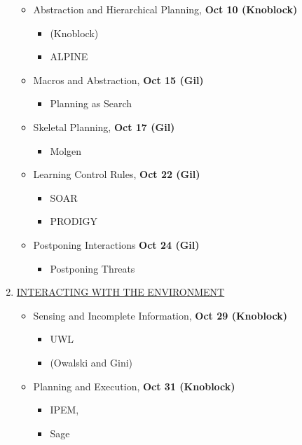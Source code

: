 \begin{enumerate}
\begin{itemize}
  \item Abstraction and Hierarchical Planning, {\bf Oct 10 (Knoblock)}
     \begin{itemize}
     \item (Knoblock) \cite{knoblock91:search} 
     \item ALPINE \cite{knoblock94:aij}
     \end{itemize}

  \item Macros and Abstraction, {\bf Oct 15 (Gil)}
     \begin{itemize}
     \item Planning as Search \cite[pages 566--578]{allen90}
     \end{itemize}

  \item Skeletal Planning, {\bf Oct 17 (Gil)}
     \begin{itemize}
     \item Molgen \cite[pages 161-180]{friedland85}
     \end{itemize}
     
  \item Learning Control Rules, {\bf Oct 22 (Gil)}
     \begin{itemize}
     \item SOAR \cite{rosenbloom92}
     \item PRODIGY \cite{minton87:ijcai,etzioni90:aaai}
     \end{itemize}

  \item Postponing Interactions {\bf Oct 24 (Gil)}
	\begin{itemize}
	\item Postponing Threats\cite{smith93:aaai}
	\end{itemize}
  \end{itemize}


\item \underline{INTERACTING WITH THE ENVIRONMENT }

  \begin{itemize}	
  \item Sensing and Incomplete Information, {\bf Oct 29 (Knoblock)}
    \begin{itemize}
    \item UWL \cite{etzioni92:incomplete}
    \item (Owalski and Gini) \cite{olawsky90}
    \end{itemize}

  \item Planning and Execution, {\bf Oct 31 (Knoblock)}
    \begin{itemize}
    \item IPEM, \cite[pages 735--740]{allen90} 
    \item Sage \cite{knoblock95:ijcai}
    \end{itemize}


\end{itemize}
\end{enumerate}
